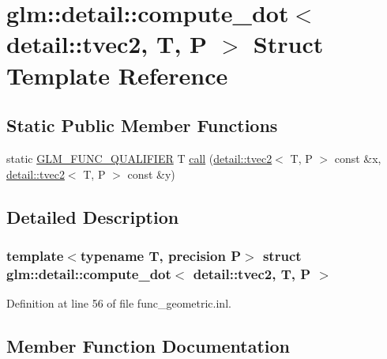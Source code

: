 \hypertarget{structglm_1_1detail_1_1compute__dot_3_01detail_1_1tvec2_00_01_t_00_01_p_01_4}{}\section{glm\+:\+:detail\+:\+:compute\+\_\+dot$<$ detail\+:\+:tvec2, T, P $>$ Struct Template Reference}
\label{structglm_1_1detail_1_1compute__dot_3_01detail_1_1tvec2_00_01_t_00_01_p_01_4}
\subsection*{Static Public Member Functions}
\begin{DoxyCompactItemize}
\item 
static \hyperlink{setup_8hpp_a33fdea6f91c5f834105f7415e2a64407}{G\+L\+M\+\_\+\+F\+U\+N\+C\+\_\+\+Q\+U\+A\+L\+I\+F\+I\+ER} T \hyperlink{structglm_1_1detail_1_1compute__dot_3_01detail_1_1tvec2_00_01_t_00_01_p_01_4_a5ab1761eaa0efc9ecb4f62171d2a6dd2}{call} (\hyperlink{structglm_1_1detail_1_1tvec2}{detail\+::tvec2}$<$ T, P $>$ const \&x, \hyperlink{structglm_1_1detail_1_1tvec2}{detail\+::tvec2}$<$ T, P $>$ const \&y)
\end{DoxyCompactItemize}


\subsection{Detailed Description}
\subsubsection*{template$<$typename T, precision P$>$\newline
struct glm\+::detail\+::compute\+\_\+dot$<$ detail\+::tvec2, T, P $>$}



Definition at line 56 of file func\+\_\+geometric.\+inl.



\subsection{Member Function Documentation}
\mbox{\label{structglm_1_1detail_1_1compute__dot_3_01detail_1_1tvec2_00_01_t_00_01_p_01_4_a5ab1761eaa0efc9ecb4f62171d2a6dd2}} 
